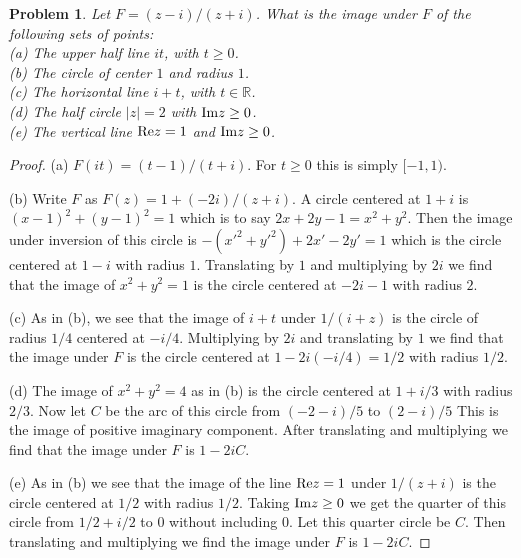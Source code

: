 \documentclass{article}
\newtheorem{problem}{Problem}
\begin{document}
\begin{problem}
Let $F = (z-i)/(z+i)$. What is the image under $F$ of the following sets of points:\\
(a) The upper half line $it$, with $t \geq 0$.\\
(b) The circle of center $1$ and radius $1$.\\
(c) The horizontal line $i + t$, with $t \in \mathbb{R}$.\\
(d) The half circle $|z| = 2$ with $\textup{Im} z \geq 0$.\\
(e) The vertical line $\textup{Re} z = 1$ and $\textup{Im} z \geq 0$.
\end{problem}
\begin{proof}
(a) $F(it) = (t-1)/(t+i)$. For $t \geq 0$ this is simply $[-1, 1)$.

(b) Write $F$ as $F(z) = 1 + (-2i)/(z+i)$. A circle centered at $1+i$ is $(x-1)^2 + (y-1)^2 = 1$ which is to say $2x + 2y - 1 = x^2 + y^2$. Then the image under inversion of this circle is $-(x'^2 + y'^2) + 2x' - 2y' = 1$ which is the circle centered at $1 - i$ with radius $1$. Translating by $1$ and multiplying by $2i$ we find that the image of $x^2 + y^2 = 1$ is the circle centered at $-2i - 1$ with radius $2$.

(c) As in (b), we see that the image of $i + t$ under $1/(i + z)$ is the circle of radius $1/4$ centered at $-i/4$. Multiplying by $2i$ and translating by $1$ we find that the image under $F$ is the circle centered at $1 - 2i(-i/4) = 1/2$ with radius $1/2$.

(d) The image of $x^2 + y^2 = 4$ as in (b) is the circle centered at $1 + i/3$ with radius $2/3$. Now let $C$ be the arc of this circle from $(-2-i)/5$ to $(2-i)/5$ This is the image of positive imaginary component. After translating and multiplying we find that the image under $F$ is $1 - 2iC$.

(e) As in (b) we see that the image of the line $\textup{Re} z = 1$ under $1/(z+i)$ is the circle centered at $1/2$ with radius $1/2$. Taking $\textup{Im} z \geq 0$ we get the quarter of this circle from $1/2 + i/2$ to $0$ without including $0$. Let this quarter circle be $C$. Then translating and multiplying we find the image under $F$ is $1 - 2iC$.
\end{proof}
\end{document}
